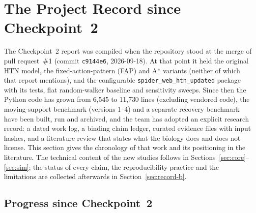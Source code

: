 
\section{The Project Record since Checkpoint~2}
\label{sec:record}

The Checkpoint~2 report was compiled when the repository stood at the merge of pull request~\#1
(commit \texttt{c9144e6}, 2026-09-18). At that point it held the original HTN model, the fixed-action-pattern (FAP)
and A* variants (neither of which that report mentions), and the configurable \texttt{spider\_\allowbreak{}web\_\allowbreak{}htn\_\allowbreak{}updated} package with its tests,
flat random-walker baseline and sensitivity sweeps. Since then the Python code has grown from 6,545 to
11,730 lines (excluding vendored code), the moving-support benchmark (versions 1--4) and a separate recovery
benchmark have been built, run and archived, and the team has adopted an explicit research record:
a dated work log, a binding claim ledger, curated evidence files with input hashes, and a
literature review that states what the biology does and does not license. This section gives the
chronology of that work and its positioning in the literature. The technical content of the new studies
follows in Sections~\ref{sec:core}--\ref{sec:sim}; the status of every claim, the reproducibility
practice and the limitations are collected afterwards in Section~\ref{sec:record-b}.

\subsection{Progress since Checkpoint~2}
\label{sec:record-progress}

